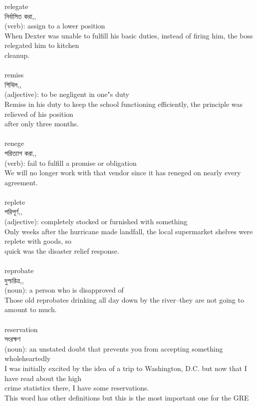 \documentclass{article}
\begin{document}
{relegate}\\
{নির্বাসিত করা,,}\\
{(verb): assign to a lower position\\When Dexter was unable to fulfill his basic duties, instead of firing him, the boss relegated him to kitchen\\cleanup.\\}\\
{remiss}\\
{শিথিল,,}\\
{(adjective): to be negligent in one"s duty\\Remiss in his duty to keep the school functioning efficiently, the principle was relieved of his position\\after only three months.\\}\\
{renege}\\
{পরিত্যাগ করা,,}\\
{(verb): fail to fulfill a promise or obligation\\We will no longer work with that vendor since it has reneged on nearly every agreement.\\}\\
{replete}\\
{পরিপূর্ণ,,}\\
{(adjective): completely stocked or furnished with something\\Only weeks after the hurricane made landfall, the local supermarket shelves were replete with goods, so\\quick was the disaster relief response.\\}\\
{reprobate}\\
{দুশ্চরিত্র,,}\\
{(noun): a person who is disapproved of\\Those old reprobates drinking all day down by the river--they are not going to amount to much.\\}\\
{reservation}\\
{সংরক্ষণ}\\
{(noun): an unstated doubt that prevents you from accepting something wholeheartedly\\I was initially excited by the idea of a trip to Washington, D.C. but now that I have read about the high\\crime statistics there, I have some reservations.\\This word has other definitions but this is the most important one for the GRE\\}\\
\end{document}

